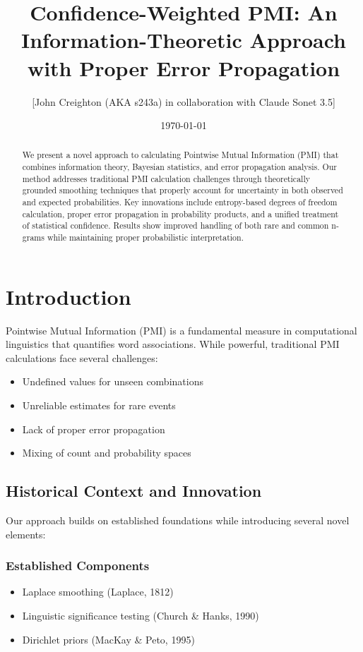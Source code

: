 \documentclass[12pt,a4paper]{article}
\title{Confidence-Weighted PMI: An Information-Theoretic Approach with Proper Error Propagation}
\author{[John Creighton (AKA s243a) in collaboration with Claude Sonet 3.5]}
\date{\today}
\begin{document}
\maketitle

\begin{abstract}
We present a novel approach to calculating Pointwise Mutual Information (PMI) that combines information theory, Bayesian statistics, and error propagation analysis. Our method addresses traditional PMI calculation challenges through theoretically grounded smoothing techniques that properly account for uncertainty in both observed and expected probabilities. Key innovations include entropy-based degrees of freedom calculation, proper error propagation in probability products, and a unified treatment of statistical confidence. Results show improved handling of both rare and common n-grams while maintaining proper probabilistic interpretation.
\end{abstract}

\section{Introduction}
Pointwise Mutual Information (PMI) is a fundamental measure in computational linguistics that quantifies word associations. While powerful, traditional PMI calculations face several challenges:
\begin{itemize}
    \item Undefined values for unseen combinations
    \item Unreliable estimates for rare events
    \item Lack of proper error propagation
    \item Mixing of count and probability spaces
\end{itemize}

\subsection{Historical Context and Innovation}
Our approach builds on established foundations while introducing several novel elements:

\subsubsection{Established Components}
\begin{itemize}
    \item Laplace smoothing (Laplace, 1812) \cite{laplace1812}
    \item Linguistic significance testing (Church \& Hanks, 1990) \cite{church1990}
    \item Dirichlet priors (MacKay \& Peto, 1995) \cite{mackay1995}
\end{itemize}
\end{document}
